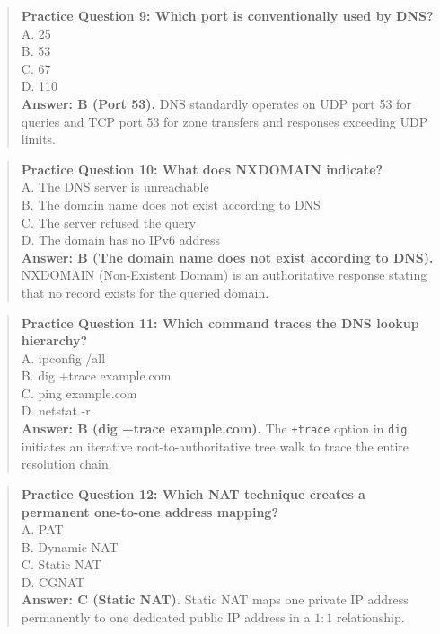 \begin{quote}
\textbf{Practice Question 9: Which port is conventionally used by DNS?}\\[4pt]
\quad A. 25\\[2pt]
\quad B. 53\\[2pt]
\quad C. 67\\[2pt]
\quad D. 110\\[2pt]
\vspace{4pt}
\textbf{Answer: B (Port 53).} DNS standardly operates on UDP port 53 for queries and TCP port 53 for zone transfers and responses exceeding UDP limits.
\end{quote}
\begin{quote}
\textbf{Practice Question 10: What does NXDOMAIN indicate?}\\[4pt]
\quad A. The DNS server is unreachable\\[2pt]
\quad B. The domain name does not exist according to DNS\\[2pt]
\quad C. The server refused the query\\[2pt]
\quad D. The domain has no IPv6 address\\[2pt]
\vspace{4pt}
\textbf{Answer: B (The domain name does not exist according to DNS).} NXDOMAIN (Non-Existent Domain) is an authoritative response stating that no record exists for the queried domain.
\end{quote}
\begin{quote}
\textbf{Practice Question 11: Which command traces the DNS lookup hierarchy?}\\[4pt]
\quad A. ipconfig /all\\[2pt]
\quad B. dig +trace example.com\\[2pt]
\quad C. ping example.com\\[2pt]
\quad D. netstat -r\\[2pt]
\vspace{4pt}
\textbf{Answer: B (dig +trace example.com).} The \texttt{+trace} option in \texttt{dig} initiates an iterative root-to-authoritative tree walk to trace the entire resolution chain.
\end{quote}
\begin{quote}
\textbf{Practice Question 12: Which NAT technique creates a permanent one-to-one address mapping?}\\[4pt]
\quad A. PAT\\[2pt]
\quad B. Dynamic NAT\\[2pt]
\quad C. Static NAT\\[2pt]
\quad D. CGNAT\\[2pt]
\vspace{4pt}
\textbf{Answer: C (Static NAT).} Static NAT maps one private IP address permanently to one dedicated public IP address in a $1:1$ relationship.
\end{quote}
